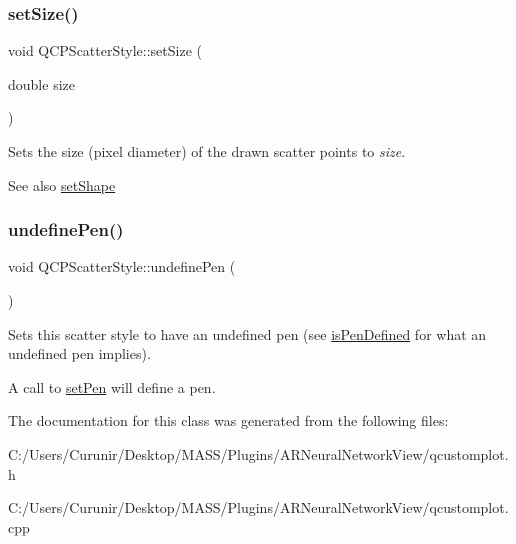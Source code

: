\subsubsection{\texorpdfstring{set\+Size()}{setSize()}}
{\footnotesize\ttfamily void Q\+C\+P\+Scatter\+Style\+::set\+Size (\begin{DoxyParamCaption}\item[{double}]{size }\end{DoxyParamCaption})}

Sets the size (pixel diameter) of the drawn scatter points to {\itshape size}.

\begin{DoxySeeAlso}{See also}
\hyperlink{class_q_c_p_scatter_style_a7c641c4d4c6d29cb705d3887cfce91c1}{set\+Shape} 
\end{DoxySeeAlso}
\mbox{\label{class_q_c_p_scatter_style_acabc2a8c83d650b946f50c3166b6c35e}} 
\subsubsection{\texorpdfstring{undefine\+Pen()}{undefinePen()}}
{\footnotesize\ttfamily void Q\+C\+P\+Scatter\+Style\+::undefine\+Pen (\begin{DoxyParamCaption}{ }\end{DoxyParamCaption})}

Sets this scatter style to have an undefined pen (see \hyperlink{class_q_c_p_scatter_style_a47077eb6450fe9a788f833e4ec1b1d5a}{is\+Pen\+Defined} for what an undefined pen implies).

A call to \hyperlink{class_q_c_p_scatter_style_a761f1f229cc0ca4703e1e2b89f6dd1ba}{set\+Pen} will define a pen. 

The documentation for this class was generated from the following files\+:\begin{DoxyCompactItemize}
\item 
C\+:/\+Users/\+Curunir/\+Desktop/\+M\+A\+S\+S/\+Plugins/\+A\+R\+Neural\+Network\+View/qcustomplot.\+h\item 
C\+:/\+Users/\+Curunir/\+Desktop/\+M\+A\+S\+S/\+Plugins/\+A\+R\+Neural\+Network\+View/qcustomplot.\+cpp\end{DoxyCompactItemize}
